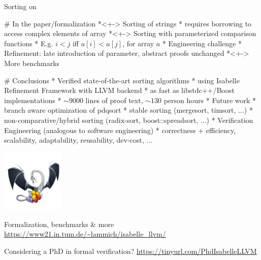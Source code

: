 \documentclass[fleqn]{beamer}
\begin{document}
  Sorting  on

# In the paper/formalization
  *<+-> Sorting of strings
    * requires borrowing to access complex elements of array
  *<+-> Sorting with parameterized comparison functions
    * E.g. $i<j$ iff $a[i]<a[j]$, for array $a$
    * Engineering challenge
    * Refinement: late introduction of parameter, abstract proofs unchanged
  *<+-> More benchmarks


# Conclusions
  * Verified state-of-the-art sorting algorithms
    * using Isabelle Refinement Framework with LLVM backend
    * as fast as libstdc++/Boost implementations
    * $\sim9000$ lines of proof text, $\sim130$ person hours
  * Future work
    * branch aware optimization of pdqsort
    * stable sorting (mergesort, timsort, ...)
    * non-comparative/hybrid sorting (radix-sort, boost::spreadsort, ...)
      \medskip
    * Verification Engineering (analogous to software engineering)
      * {\color{green} correctness} + efficiency, scalability, adaptability, reusability, dev-cost, ...

  \vfill

  \includegraphics[width=3cm,align=c]{isabelle-llvm.png}~~\begin{minipage}{.7\textwidth}
    \color{black}Formalization, benchmarks \& more\\
    \url{https://www21.in.tum.de/~lammich/isabelle_llvm/}
  \end{minipage}

  \vfill
  Considering a PhD in formal verification? \url{https://tinyurl.com/PhdIsabelleLLVM}
\end{document}
